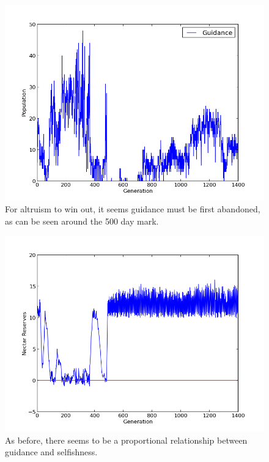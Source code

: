 \documentclass[twoside]{article}
\begin{document}
\begin{multicols}{2}
                        \begin{figure}[H]
				\begin{center}
					\includegraphics[width=.5\textwidth]{results/gossip_alt_tell.png}
				\end{center}
                \caption{For altruism to win out, it seems guidance must be first abandoned, as can be seen around the 500 day mark.}
				\label{fig:altruistic_guidance}
			\end{figure}

			\begin{figure}[H]
				\begin{center}
					\includegraphics[width=.5\textwidth]{results/gossip_alt_res.png}
				\end{center}
                \caption{As before, there seems to be a proportional relationship between guidance and selfishness.}
				\label{fig:altruistic_reserves}
			\end{figure}



\end{multicols}
\end{document}
